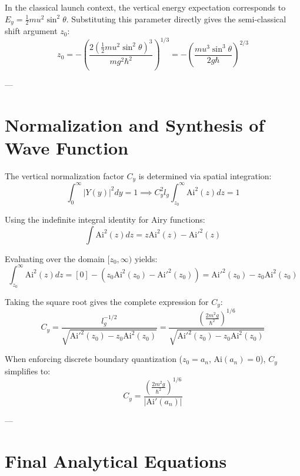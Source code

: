 \documentclass[11pt, a4paper]{article}
\begin{document}
In the classical launch context, the vertical energy expectation corresponds to $E_y = \frac{1}{2} m u^2 \sin^2\theta$. Substituting this parameter directly gives the semi-classical shift argument $z_0$:
\begin{equation}
z_0 = -\left( \frac{2 \left(\frac{1}{2}m u^2 \sin^2\theta\right)^3}{m g^2 \hbar^2} \right)^{1/3} = -\left( \frac{m u^3 \sin^3\theta}{2 g \hbar} \right)^{2/3}
\end{equation}

---

\section{Normalization and Synthesis of Wave Function}

The vertical normalization factor $C_y$ is determined via spatial integration:
\begin{equation}
\int_{0}^{\infty} |Y(y)|^2 dy = 1 \implies C_y^2 l_g \int_{z_0}^{\infty} \text{Ai}^2(z) dz = 1
\end{equation}

Using the indefinite integral identity for Airy functions:
\begin{equation}
\int \text{Ai}^2(z) dz = z \text{Ai}^2(z) - \text{Ai}'^2(z)
\end{equation}

Evaluating over the domain $[z_0, \infty)$ yields:
\begin{equation}
\int_{z_0}^{\infty} \text{Ai}^2(z) dz = \left[ 0 \right] - \left( z_0 \text{Ai}^2(z_0) - \text{Ai}'^2(z_0) \right) = \text{Ai}'^2(z_0) - z_0 \text{Ai}^2(z_0)
\end{equation}

Taking the square root gives the complete expression for $C_y$:
\begin{equation}
C_y = \frac{l_g^{-1/2}}{\sqrt{\text{Ai}'^2(z_0) - z_0 \text{Ai}^2(z_0)}} = \frac{\left( \frac{2 m^2 g}{\hbar^2} \right)^{1/6}}{\sqrt{\text{Ai}'^2(z_0) - z_0 \text{Ai}^2(z_0)}}
\end{equation}

When enforcing discrete boundary quantization ($z_0 = a_n$, $\text{Ai}(a_n) = 0$), $C_y$ simplifies to:
\begin{equation}
C_y = \frac{\left( \frac{2 m^2 g}{\hbar^2} \right)^{1/6}}{|\text{Ai}'(a_n)|}
\end{equation}

---

\section{Final Analytical Equations}
\end{document}
